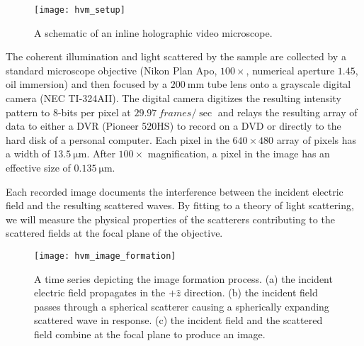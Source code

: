 \begin{figure}
  \centering
  \texttt{[image: hvm\_setup]}
  \caption{A schematic of an inline holographic video microscope.}
  \label{fig:hvm_setup}
\end{figure}


The coherent illumination and light scattered by the sample are collected by a
standard microscope objective (Nikon Plan Apo, $\num{100}\times$,
numerical aperture $\num{1.45}$, oil immersion) and then focused
by a $\SI{200}{\mm}$ tube lens onto a grayscale digital camera
(NEC TI-324AII). The digital camera digitizes the resulting intensity
pattern to $8$-bits per pixel at $\SI{29.97}{frames / \sec}$ and relays the
resulting array of data to either a DVR (Pioneer 520HS) to record
on a DVD or directly to the hard disk of a personal computer.
Each pixel in the $\si{640\times 480}$ array of pixels has a width of
$\SI{13.5}{\um}$. After $100\times$ magnification, a pixel in the
image has an effective size of $\SI{0.135}{\um}$.

Each recorded image documents the interference between the incident
electric field and the resulting scattered waves. By fitting
to a theory of light scattering, we will measure the physical
properties of the scatterers contributing to the scattered fields
at the focal plane of the objective.





\begin{figure}
  \centering
  \texttt{[image: hvm\_image\_formation]}
  \caption{A time series depicting the image formation process. (a) the incident
    electric field propagates in the $+\hat{z}$ direction. (b) the
    incident field passes through a spherical scatterer causing a
    spherically expanding scattered wave in response. (c) the incident
    field and the scattered field combine at the focal plane to produce
    an image.}
  \label{fig:image_formation}
\end{figure}


